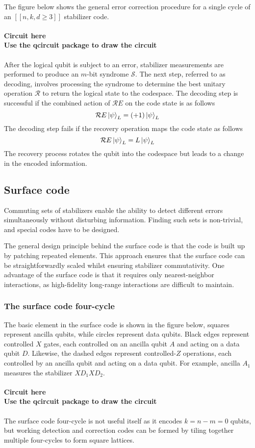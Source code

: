 \documentclass[final,5p,times,twocolumn,authoryear]{elsarticle}
\begin{document}
The figure below shows the general error correction procedure for a single cycle of an $[[n,k,d \geq 3]]$ stabilizer code.
\\
\\
\textbf{Circuit here}
\\
\textbf{Use the qcircuit package to draw the circuit}
\\
\\
After the logical qubit is subject to an error, stabilizer measurements are performed to produce an $m$-bit syndrome $\mathcal{S}$. The next step, referred to as decoding, involves processing the syndrome to determine the best unitary operation $\mathcal{R}$ to return the logical state to the codespace. The decoding step is successful if the combined action of $\mathcal{R}E$ on the code state is as follows
\[
    \mathcal{R}E \ket{\psi}_L = (+1) \ket{\psi}_L
\]
The decoding step fails if the recovery operation maps the code state as follows
\[
    \mathcal{R}E \ket{\psi}_L = L \ket{\psi}_L
\]
The recovery process rotates the qubit into the codespace but leads to a change in the encoded information.

\subsection{Surface code}

Commuting sets of stabilizers enable the ability to detect different errors simultaneously without disturbing information. Finding such sets is non-trivial, and special codes have to be designed.

The general design principle behind the surface code is that the code is built up by patching repeated elements. This approach ensures that the surface code can be straightforwardly scaled whilst ensuring stabilizer commutativity. One advantage of the surface code is that it requires only nearest-neighbor interactions, as high-fidelity long-range interactions are difficult to maintain.

\subsubsection{The surface code four-cycle}

The basic element in the surface code is shown in the figure below, squares represent ancilla qubits, while circles represent data qubits. Black edges represent controlled $X$ gates, each controlled on an ancilla qubit $A$ and acting on a data qubit $D$. Likewise, the dashed edges represent controlled-$Z$ operations, each controlled by an ancilla qubit and acting on a data qubit.
For example, ancilla $A_1$ measures the stabilizer $XD_1XD_2$.
\\
\\
\textbf{Circuit here}
\\
\textbf{Use the qcircuit package to draw the circuit}
\\
\\
The surface code four-cycle is not useful itself as it encodes $k=n-m=0$ qubits, but working detection and correction codes can be formed by tiling together multiple four-cycles to form square lattices.
\end{document}
